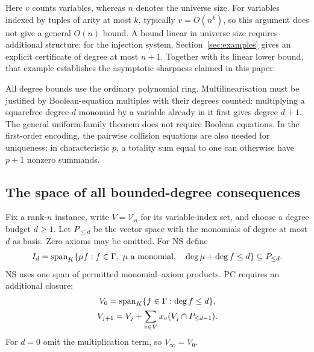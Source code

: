 \documentclass[11pt,a4paper]{article}
\theoremstyle{definition}\newtheorem{definition}[theorem]{Definition}
\theoremstyle{remark}\newtheorem{remark}[theorem]{Remark}
\begin{document}
Here $v$ counts variables, whereas $n$ denotes the universe size. For
variables indexed by tuples of arity at most $k$, typically $v=O(n^k)$,
so this argument does not give a general $O(n)$ bound. A bound linear
in universe size requires additional structure: for the injection
system, Section~\ref{sec:examples} gives an explicit certificate of
degree at most $n+1$. Together with its linear lower bound, that
example establishes the asymptotic sharpness claimed in this paper.

All degree bounds use the ordinary polynomial ring. Multilinearisation
must be justified by Boolean-equation multiples with their degrees
counted: multiplying a squarefree degree-$d$ monomial by a variable
already in it first gives degree $d+1$. The general uniform-family
theorem does not require Boolean equations. In the first-order
encoding, the pairwise collision equations are also needed for
uniqueness: in characteristic $p$, a totality sum equal to one can
otherwise have $p+1$ nonzero summands.

\subsection{The space of all bounded-degree consequences}\label{sec:pc-space}
Fix a rank-$n$ instance, write $V=\mathcal V_n$ for its variable-index
set, and choose a degree budget $d\ge1$. Let $P_{\le d}$ be the
vector space with the monomials of degree at most $d$ as basis. Zero
axioms may be omitted. For NS define
\begin{equation}\label{eq:nsspan}
 I_d=\operatorname{span}_K\{\mu f:f\in\Gamma,\ \mu\text{ a monomial},\quad
                       \deg\mu+\deg f\le d\}\subseteq P_{\le d}.
\end{equation}
NS uses one span of permitted monomial--axiom products. PC requires an
additional closure:
\begin{equation}\label{eq:pcclosure}
 \begin{gathered}
 V_0=\operatorname{span}_K\{f\in\Gamma:\deg f\le d\},\\
 V_{j+1}=V_j+\sum_{v\in V}x_v(V_j\cap P_{\le d-1}).
 \end{gathered}
\end{equation}
For $d=0$ omit the multiplication term, so $V_\infty=V_0$.
\end{document}
